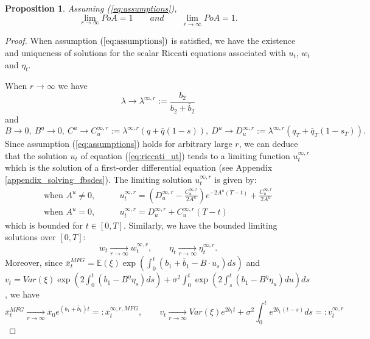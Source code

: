 \documentclass[11pt]{article}
\newtheorem{proposition}{Proposition}
\begin{document}
\begin{proposition}
	Assuming (\ref{eq:assumptions}),
	\begin{equation*}
			\lim_{r \to \infty} PoA = 1 \qquad and \qquad
			\lim_{\bar{r} \to \infty} PoA = 1.
	\end{equation*}
	\label{prop:r_bar_r}
\end{proposition}
\begin{proof}
	When assumption $(\ref{eq:assumptions})$ is satisfied, we have the existence and uniqueness of solutions for the scalar Riccati equations associated with $u_t$, $w_t$ and $\eta_t$.
	
	When $r \to \infty$ we have
	\begin{equation*}
		\lambda \to \lambda^{\infty,r} := \frac{b_2}{b_2 + \bar{b}_2}
	\end{equation*}
	and
	\begin{equation*}
		B \to 0,\ B^\eta \to 0,\ C^u \to C_u^{\infty,r} := \lambda^{\infty,r}(q + \bar{q}(1-s)),\ D^{u} \to D_u^{\infty,r} := \lambda^{\infty,r}(q_T+ \bar{q}_T(1-s_T)).
	\end{equation*}
	Since assumption (\ref{eq:assumptions}) holds for arbitrary large $r$, we can deduce that the solution $u_t$ of equation (\ref{eq:riccati_ut}) tends to a limiting function $u^{\infty,r}_t$ which is the solution of a first-order differential equation (see Appendix \ref{appendix_solving_fbsdes}). The limiting solution $u_t^{\infty,r}$ is given by:
	\begin{equation*}
	\begin{split}
	    \text{when } A^u \neq 0,\qquad & u_t^{\infty,r} = \left(D^{\infty,r}_u - \frac{C^{\infty,r}_u}{2A^u} \right) e^{-2A^u (T-t)} +  \frac{C^{\infty,r}_u}{2A^u}\\
	    \text{when } A^u = 0, \qquad & u_t^{\infty,r} = D^{\infty,r}_u + C^{\infty,r}_u (T-t)
	\end{split}
	\end{equation*}
	which is bounded for $t \in [0,T]$.
	Similarly, we have the bounded limiting solutions over $[0,T]$:
	$$w_t \xrightarrow[r \to \infty]{} w_t^{\infty,r},\qquad \eta_t \xrightarrow[r \to \infty]{} \eta_t^{\infty,r}.$$
	Moreover, since $\bar{x}_t^{MFG} = \mathbb{E}(\xi) \exp(\int_0^t (b_1 + \bar{b}_1 - B\cdot u_s)ds)$ and $v_t = Var(\xi)\exp(2\int_0^t (b_1 - B^\eta \eta_s) ds) + \sigma^2 \int_0^t \exp(2 \int_s^t (b_1 - B^\eta \eta_u) du) ds$, we have 
	$$	\bar{x}_t^{MFG} \xrightarrow[r\to \infty]{} \bar{x}_0 e^{(b_1+ \bar{b}_1)t} =: \bar{x}_t^{\infty,r,MFG},\qquad
	  v_t \xrightarrow[r\to \infty]{} Var(\xi)e^{2b_1t} + \sigma^2 \int_0^t e^{2 b_1 (t-s) } ds =: v^{\infty,r}_t
$$
\end{proof}
\end{document}
